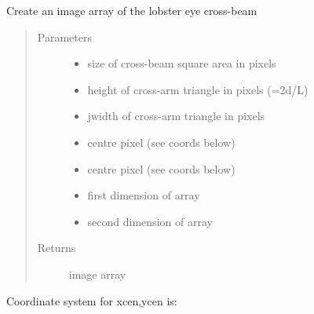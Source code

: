 \documentclass[letterpaper,10pt,english]{sphinxmanual}
\begin{document}
\begin{fulllineitems}
\label{\detokenize{images_functions:images.lecimage}}
Create an image array of the lobster eye cross-beam
\begin{quote}\begin{description}
\item[{Parameters}] \leavevmode\begin{itemize}
\item {} 
 \textendash{} size of cross-beam square area in pixels

\item {} 
 \textendash{} height of cross-arm triangle in pixels (=2d/L)

\item {} 
 \textendash{} jwidth of cross-arm triangle in pixels

\item {} 
 \textendash{} centre pixel (see coords below)

\item {} 
 \textendash{} centre pixel (see coords below)

\item {} 
 \textendash{} first dimension of array

\item {} 
 \textendash{} second dimension of array

\end{itemize}

\item[{Returns}] \leavevmode
image array

\end{description}\end{quote}
\begin{description}
\item[{Coordinate system for xcen,ycen is:}] \leavevmode
{}

\end{description}

\end{fulllineitems}
\end{document}

